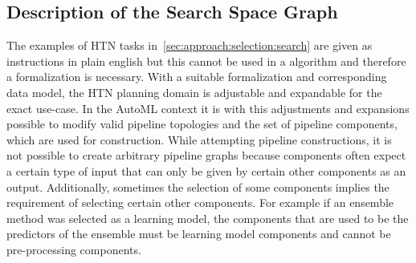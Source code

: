 \subsection{Description of the Search Space Graph}
\label{sec:approach:selection:graph}
The examples of HTN tasks in~\ref{sec:approach:selection:search} are given as instructions in plain english but this cannot be used in a algorithm and therefore a formalization is necessary.
With a suitable formalization and corresponding data model, the HTN planning domain is adjustable and expandable for the exact use-case.
In the AutoML context it is with this adjustments and expansions possible to modify valid pipeline topologies and the set of pipeline components, which are used for construction.\newline
While attempting pipeline constructions, it is not possible to create arbitrary pipeline graphs because components often expect a certain type of input that can only be given by certain other components as an output.
Additionally, sometimes the selection of some components implies the requirement of selecting certain other components.
For example if an ensemble method was selected as a learning model, the components that are used to be the predictors of the ensemble must be learning model components and cannot be pre-processing components.

